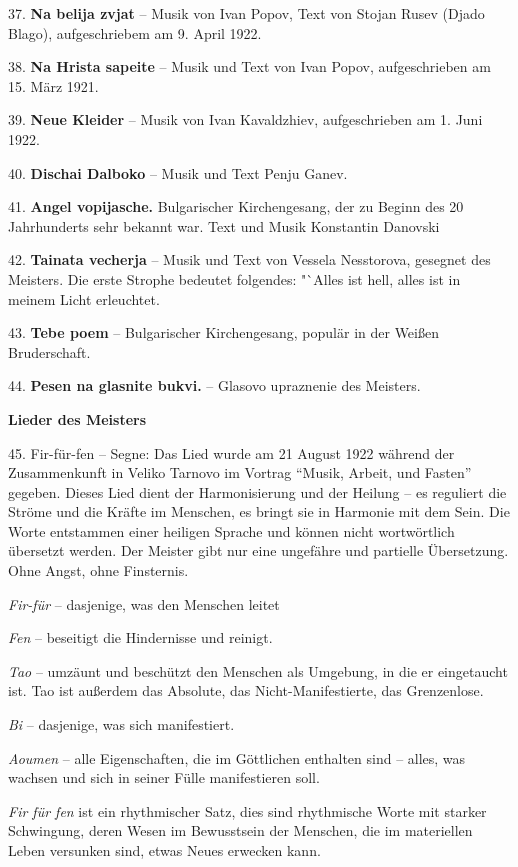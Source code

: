 \documentclass[11pt,a5paper,twoside]{article}
\begin{document}
37. \textbf{Na belija zvjat} -- Musik von Ivan Popov, Text von Stojan Rusev (Djado Blago), aufgeschriebem am 9. April 1922.

38. \textbf{Na Hrista sapeite} -- Musik und Text von Ivan Popov, aufgeschrieben am 15. März 1921.

39. \textbf{Neue Kleider} -- Musik von Ivan Kavaldzhiev, aufgeschrieben am 1. Juni 1922.

40. \textbf{Dischai Dalboko} -- Musik und Text Penju Ganev.

41. \textbf{Angel vopijasche.} Bulgarischer Kirchengesang, der zu Beginn des 20 Jahrhunderts sehr bekannt war. Text und Musik Konstantin Danovski
 
 42. \textbf{Tainata vecherja} -- Musik und Text von Vessela Nesstorova, gesegnet des Meisters. Die erste Strophe bedeutet folgendes: "`Alles ist hell, alles ist in meinem Licht erleuchtet.
 
43. \textbf{Tebe poem} -- Bulgarischer Kirchengesang, populär in der Weißen Bruderschaft.

44. \textbf{Pesen na glasnite bukvi.} -- Glasovo upraznenie des Meisters. 

\begin{center}
\textbf{Lieder des Meisters}
\end{center}

45. Fir-für-fen -- Segne: Das Lied wurde am 21 August 1922 während der Zusammenkunft in Veliko Tarnovo im Vortrag "`Musik, Arbeit, und Fasten"' gegeben. Dieses Lied dient der Harmonisierung und der Heilung -- es reguliert die Ströme und die Kräfte im Menschen, es bringt sie in Harmonie mit dem Sein. Die Worte entstammen einer heiligen Sprache und können nicht wortwörtlich übersetzt werden. Der Meister gibt nur eine ungefähre und partielle Übersetzung. Ohne Angst, ohne Finsternis. 
	
\textit{Fir-für} -- dasjenige, was den Menschen leitet
	
\textit{Fen} -- beseitigt die Hindernisse und reinigt.

\textit{Tao} -- umzäunt und beschützt den Menschen als Umgebung, in die er eingetaucht ist. Tao ist außerdem das Absolute, das Nicht-Manifestierte, das Grenzenlose.
	
\textit{Bi} -- dasjenige, was sich manifestiert.
	
\textit{Aoumen} -- alle Eigenschaften, die im Göttlichen enthalten sind -- alles, was wachsen und sich in seiner Fülle manifestieren soll.
	
\textit{Fir für fen} ist ein rhythmischer Satz, dies sind rhythmische Worte mit starker Schwingung, deren Wesen im Bewusstsein der Menschen, die im materiellen Leben versunken sind, etwas Neues erwecken kann.
\end{document}
